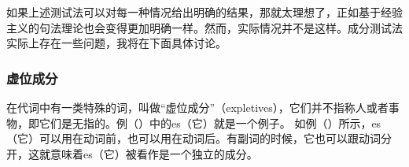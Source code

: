 如果上述测试法可以对每一种情况给出明确的结果，那就太理想了，正如基于经验主义的句法理论也会变得更加明确一样。然而，实际情况并不是这样。成分测试法实际上存在一些问题，我将在下面具体讨论。

\subsubsection{虚位成分}

在代词中有一类特殊的词，叫做“虚位成分”（expletives），它们并不指称人或者事物，即它们是无指的。例（）中的es（它）就是一个例子。
\eal
{}
\zl
如例（）所示，es（它）可以用在动词前，也可以用在动词后。有副词的时候，它也可以跟动词分开，这就意味着es（它）被看作是一个独立的成分。

